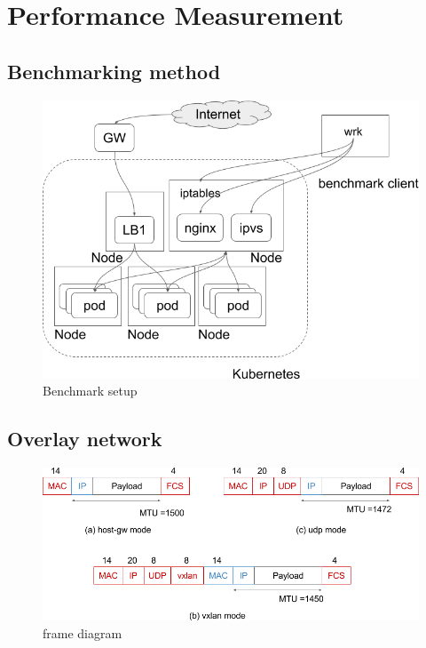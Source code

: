 \section{Performance Measurement}
\subsection{Benchmarking method}

\begin{figure}
\includegraphics[width=\columnwidth]{Figs/benchmark-schem}
\caption{Benchmark setup}
\label{fig:benchmark-schem}
\end{figure}

\subsection{Overlay network}

\begin{figure}
\includegraphics[width=\columnwidth]{Figs/flannel-packet-diagram}
\caption{frame diagram}
\label{fig:flannel-packet-diagram}
\end{figure}


